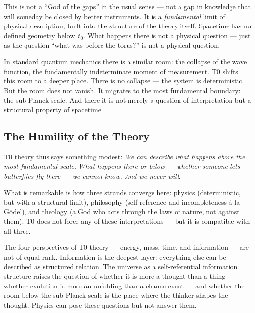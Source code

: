 This is not a ``God of the gaps'' in the usual sense --- not a gap in knowledge that will someday be closed by better instruments. It is a \emph{fundamental} limit of physical description, built into the structure of the theory itself. Spacetime has no defined geometry below~$t_0$. What happens there is not a physical question --- just as the question ``what was before the torus?'' is not a physical question.

In standard quantum mechanics there is a similar room: the collapse of the wave function, the fundamentally indeterminate moment of measurement. T0 shifts this room to a deeper place. There is no collapse --- the system is deterministic. But the room does not vanish. It migrates to the most fundamental boundary: the sub-Planck scale. And there it is not merely a question of interpretation but a structural property of spacetime.

\subsection{The Humility of the Theory}

T0 theory thus says something modest: \emph{We can describe what happens above the most fundamental scale. What happens there or below --- whether someone lets butterflies fly there --- we cannot know. And we never will.}

What is remarkable is how three strands converge here: physics (deterministic, but with a structural limit), philosophy (self-reference and incompleteness \`a la G\"odel), and theology (a God who acts through the laws of nature, not against them). T0 does not force any of these interpretations --- but it is compatible with all three.

\begin{kerngedanke}
The four perspectives of T0 theory --- energy, mass, time, and information --- are not of equal rank. Information is the deepest layer: everything else can be described as structured relation. The universe as a self-referential information structure raises the question of whether it is more a thought than a thing --- whether evolution is more an unfolding than a chance event --- and whether the room below the sub-Planck scale is the place where the thinker shapes the thought. Physics can pose these questions but not answer them.
\end{kerngedanke}
